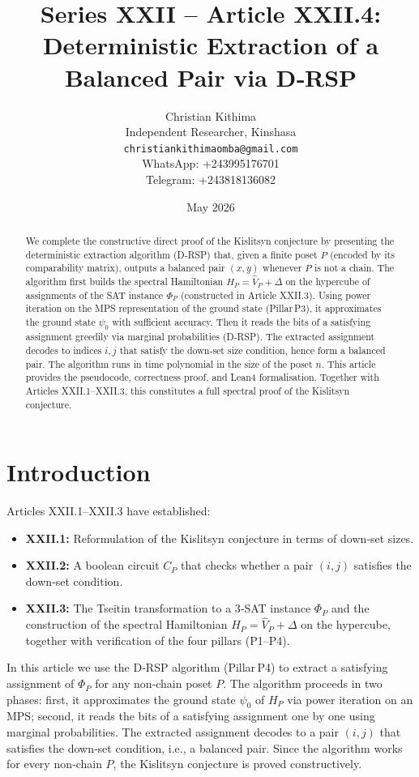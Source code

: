\documentclass[11pt,a4paper]{article}
\title{Series XXII – Article XXII.4: Deterministic Extraction of a Balanced Pair via D‑RSP}
\author{Christian Kithima \\
Independent Researcher, Kinshasa \\
\texttt{christiankithimaomba@gmail.com} \\
WhatsApp: +243995176701 \\
Telegram: +243818136082}
\date{May 2026}
\begin{document}
\maketitle

\begin{abstract}
We complete the constructive direct proof of the Kislitsyn conjecture by presenting the deterministic extraction algorithm (D‑RSP) that, given a finite poset $P$ (encoded by its comparability matrix), outputs a balanced pair $(x,y)$ whenever $P$ is not a chain. The algorithm first builds the spectral Hamiltonian $H_P = \hat{V}_P + \Delta$ on the hypercube of assignments of the SAT instance $\Phi_P$ (constructed in Article XXII.3). Using power iteration on the MPS representation of the ground state (Pillar P3), it approximates the ground state $\psi_0$ with sufficient accuracy. Then it reads the bits of a satisfying assignment greedily via marginal probabilities (D‑RSP). The extracted assignment decodes to indices $i,j$ that satisfy the down‑set size condition, hence form a balanced pair. The algorithm runs in time polynomial in the size of the poset $n$. This article provides the pseudocode, correctness proof, and Lean4 formalisation. Together with Articles XXII.1–XXII.3, this constitutes a full spectral proof of the Kislitsyn conjecture.
\end{abstract}

\tableofcontents

\section{Introduction}

Articles XXII.1–XXII.3 have established:
\begin{itemize}
\item \textbf{XXII.1:} Reformulation of the Kislitsyn conjecture in terms of down‑set sizes.
\item \textbf{XXII.2:} A boolean circuit $C_P$ that checks whether a pair $(i,j)$ satisfies the down‑set condition.
\item \textbf{XXII.3:} The Tseitin transformation to a 3‑SAT instance $\Phi_P$ and the construction of the spectral Hamiltonian $H_P = \hat{V}_P + \Delta$ on the hypercube, together with verification of the four pillars (P1–P4).
\end{itemize}
In this article we use the D‑RSP algorithm (Pillar P4) to extract a satisfying assignment of $\Phi_P$ for any non‑chain poset $P$. The algorithm proceeds in two phases: first, it approximates the ground state $\psi_0$ of $H_P$ via power iteration on an MPS; second, it reads the bits of a satisfying assignment one by one using marginal probabilities. The extracted assignment decodes to a pair $(i,j)$ that satisfies the down‑set condition, i.e., a balanced pair. Since the algorithm works for every non‑chain $P$, the Kislitsyn conjecture is proved constructively.
\end{document}
